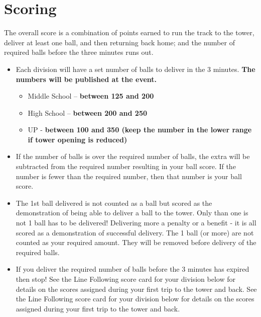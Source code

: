 \documentclass[a4paper,12pt]{article}
\begin{document}
\section{Scoring}
The overall score is a combination of points earned to run the track to the tower, deliver at least
one ball, and then returning back home; and the number of required balls before the three
minutes runs out.
\begin{itemize}
\item Each division will have a set number of balls to deliver in the 3 minutes.
\textbf{The numbers will be published
at the event.}
\begin{itemize}
	\item Middle School – \textbf{between 125 and 200}
\item High School – \textbf{between 200 and 250}
\item UP - \textbf{between 100 and 350 (keep the number in the
lower range if tower opening is reduced)}
\end{itemize}
\item If the number of balls is over
the required number of balls, the extra will be
subtracted
from the required number resulting in your ball score. If the number is fewer than the required
number, then that number is your ball score.
\item The 1st ball delivered is not counted as a ball but scored as the demonstration of being able
to deliver a ball to the tower. Only
than
one is not
1 ball
has to
be delivered! Delivering more
a penalty or a benefit - it is all scored as a demonstration of successful
delivery. The 1 ball (or more) are not counted as your required amount. They will be removed
before delivery of the required balls.
\item If you deliver the required number of balls before the 3 minutes has expired then stop!
See the Line Following score card for your division below for details on the scores assigned
during your first trip to the tower and back.
See the Line Following score card for your division below for details on the scores assigned
during your first trip to the tower and back.
\end{itemize}
\end{document}
